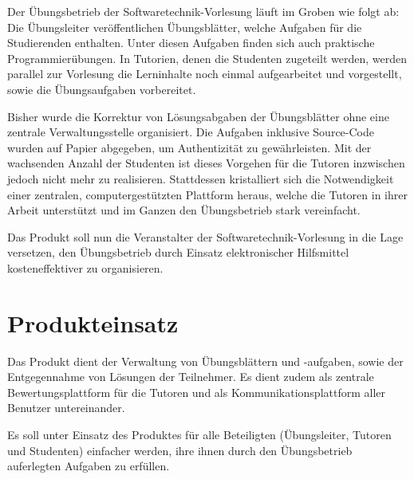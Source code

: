 \documentclass[a4paper,10pt]{article}
\begin{document}
Der Übungsbetrieb der Softwaretechnik-Vorlesung läuft im Groben wie folgt ab: Die Übungsleiter veröffentlichen Übungsblätter, welche Aufgaben für die Studierenden enthalten.  Unter diesen Aufgaben finden sich auch praktische Programmierübungen.  In Tutorien, denen die Studenten zugeteilt werden, werden parallel zur Vorlesung die Lerninhalte noch einmal aufgearbeitet und vorgestellt, sowie die Übungsaufgaben vorbereitet.

Bisher wurde die Korrektur von Lösungsabgaben der Übungsblätter ohne eine zentrale Verwaltungsstelle organisiert.  Die Aufgaben inklusive Source-Code wurden auf Papier abgegeben, um Authentizität zu gewährleisten.  Mit der wachsenden Anzahl der Studenten ist dieses Vorgehen für die Tutoren inzwischen jedoch nicht mehr zu realisieren.  Stattdessen kristalliert sich die Notwendigkeit einer zentralen, computergestützten Plattform heraus, welche die Tutoren in ihrer Arbeit unterstützt und im Ganzen den Übungsbetrieb stark vereinfacht.

Das Produkt soll nun die Veranstalter der Softwaretechnik-Vorlesung in die Lage versetzen, den Übungsbetrieb durch Einsatz elektronischer Hilfsmittel kosteneffektiver zu organisieren.

\section{Produkteinsatz}

Das Produkt dient der Verwaltung von Übungsblättern und -aufgaben, sowie der Entgegennahme von Lösungen der Teilnehmer.  Es dient zudem als zentrale Bewertungsplattform für die Tutoren und als Kommunikationsplattform aller Benutzer untereinander.

Es soll unter Einsatz des Produktes für alle Beteiligten (Übungsleiter, Tutoren und Studenten) einfacher werden, ihre ihnen durch den Übungsbetrieb auferlegten Aufgaben zu erfüllen.
\end{document}
